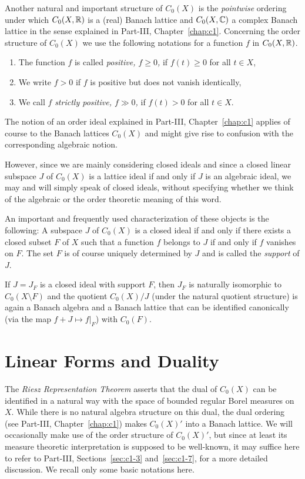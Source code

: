 Another natural and important structure of\/ $C_{0}(X)$ is the \emph{pointwise} ordering under which $C_{0}(X,\mathbb{R})$ is a (real) Banach lattice and $C_{0}(X,\mathbb{C})$ a complex Banach lattice in the sense explained in Part-III, Chapter~\ref{chap:c1}.
Concerning the order structure of\/ $C_{0}(X)$ we use the following notations for a function $f$ in $C_{0}(X,\mathbb{R})$.
\begin{enumerate}[\upshape (i), labelindent=.25em]
\item
The function $ f $ is called \emph{positive, $ f \geq 0 $,} if\/ $ f(t) \geq 0  $ for all $ t \in X $, 

\item
We write $f>0$ if\/ $ f $ is positive but does not vanish identically,

\item
We call $ f $ \emph{strictly positive, $f \gg 0$,}  if\/ $ f(t) > 0 $ for all $ t \in X $.

\end{enumerate}
The notion of an order ideal explained in Part-III, Chapter~\ref{chap:c1} applies of course to the Banach lattices $C_{0}(X)$ and might give rise to confusion with the corresponding algebraic notion.

However, since we are mainly considering closed ideals and since a closed linear subspace $J$ of\/ $C_{0}(X)$ is a lattice ideal if and only if\/ $J$ is an algebraic ideal, we may and will simply speak of closed ideals, without specifying whether we think of the algebraic or the order theoretic meaning of this word.

An important and frequently used characterization of these objects is the following: A subspace $J$ of\/ $C_{0}(X)$ is a closed ideal if and only if there exists a closed subset $F$ of\/ $X$ such that a function $f$ belongs to $J$ if and only if\/ $f$ vanishes on $F$.
The set $F$ is of course uniquely determined by $J$ and is called the \emph{support} of\/ $J$.

If\/ $J = J_{F}$ is a closed ideal with support $F$, then $J_{F}$ is naturally isomorphic to $C_{0}(X\setminus F)$ and the quotient $C_{0}(X)/J$ (under the natural quotient structure) is again a Banach algebra and a Banach lattice that can be identified canonically (via the map $f + J \mapsto f\vert_{F}$) with $C_{0}(F)$.
\section{Linear Forms and Duality}\label{sec:b1-2}%
The \emph{Riesz Representation Theorem} asserts that the dual of\/ $C_{0}(X)$ can be identified in a natural way with the space of bounded regular Borel measures on $X$.
While there is no natural algebra structure on this dual, the dual ordering (see Part-III, Chapter~\ref{chap:c1}) makes $C_{0}(X)'$ into a Banach lattice.
We will occasionally make use of the order structure of\/ $C_{0}(X)'$, but since at least its measure theoretic interpretation is supposed to be well-known, it may suffice here to refer to Part-III,
Sections~\ref{sec:c1-3} and~\ref{sec:c1-7}, for a more detailed discussion.
We recall only some basic notations here.


